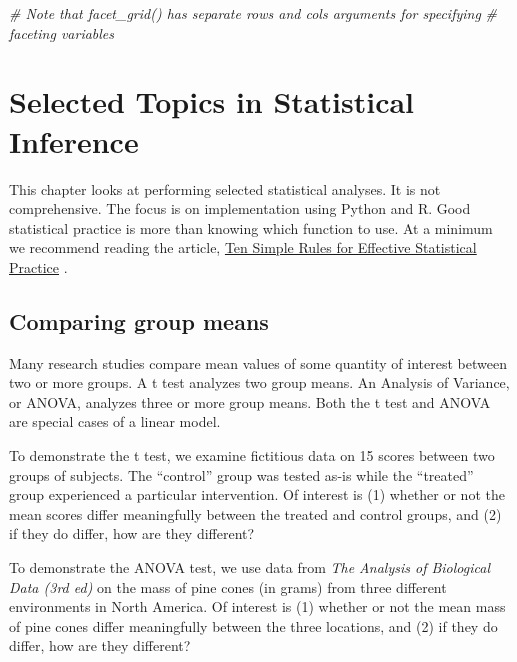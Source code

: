 \documentclass[
]{book}
\newenvironment{Shaded}{\begin{snugshade}}{\end{snugshade}}
\newcommand{\CommentTok}[1]{\textcolor[rgb]{0.56,0.35,0.01}{\textit{#1}}}
\begin{document}
\begin{Shaded}
\begin{Highlighting}[]
\CommentTok{\# Note that facet\_grid() has separate \textasciigrave{}rows\textasciigrave{} and \textasciigrave{}cols\textasciigrave{} arguments for specifying}
\CommentTok{\# faceting variables}
\end{Highlighting}
\end{Shaded}

\hypertarget{selected-topics-in-statistical-inference}{%
\chapter{Selected Topics in Statistical Inference}\label{selected-topics-in-statistical-inference}}

This chapter looks at performing selected statistical analyses. It is not comprehensive. The focus is on implementation using Python and R. Good statistical practice is more than knowing which function to use. At a minimum we recommend reading the article, \href{https://journals.plos.org/ploscompbiol/article?id=10.1371/journal.pcbi.1004961}{Ten Simple Rules for Effective Statistical Practice} \citep{kass_caffo_davidian_meng_yu_reid_2016}.

\hypertarget{comparing-group-means}{%
\section{Comparing group means}\label{comparing-group-means}}

Many research studies compare mean values of some quantity of interest between two or more groups. A t test analyzes two group means. An Analysis of Variance, or ANOVA, analyzes three or more group means. Both the t test and ANOVA are special cases of a linear model.

To demonstrate the t test, we examine fictitious data on 15 scores between two groups of subjects. The ``control'' group was tested as-is while the ``treated'' group experienced a particular intervention. Of interest is (1) whether or not the mean scores differ meaningfully between the treated and control groups, and (2) if they do differ, how are they different?

To demonstrate the ANOVA test, we use data from \emph{The Analysis of Biological Data (3rd ed)}\citep{whitlock_schluter_2020} on the mass of pine cones (in grams) from three different environments in North America. Of interest is (1) whether or not the mean mass of pine cones differ meaningfully between the three locations, and (2) if they do differ, how are they different?
\end{document}
